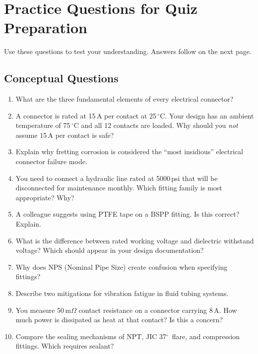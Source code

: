 \documentclass[11pt,letterpaper,twoside,openany]{book}
\newcommand{\degC}{\ensuremath{{}^{\circ}\text{C}}}
\begin{document}
\section{Practice Questions for Quiz Preparation}

Use these questions to test your understanding. Answers follow on the next page.

\subsection{Conceptual Questions}

\begin{enumerate}[leftmargin=1.5em]
  \item What are the three fundamental elements of every electrical connector?

  \item A connector is rated at 15\,A per contact at 25\,\degC{}. Your design has an ambient temperature of 75\,\degC{} and all 12 contacts are loaded. Why should you \emph{not} assume 15\,A per contact is safe?

  \item Explain why fretting corrosion is considered the ``most insidious'' electrical connector failure mode.

  \item You need to connect a hydraulic line rated at 5000\,psi that will be disconnected for maintenance monthly. Which fitting family is most appropriate? Why?

  \item A colleague suggests using PTFE tape on a BSPP fitting. Is this correct? Explain.

  \item What is the difference between rated working voltage and dielectric withstand voltage? Which should appear in your design documentation?

  \item Why does NPS (Nominal Pipe Size) create confusion when specifying fittings?

  \item Describe two mitigations for vibration fatigue in fluid tubing systems.

  \item You measure 50\,m$\Omega$ contact resistance on a connector carrying 8\,A. How much power is dissipated as heat at that contact? Is this a concern?

  \item Compare the sealing mechanisms of NPT, JIC 37$^{\circ}$\ flare, and compression fittings. Which requires sealant?
\end{enumerate}
\end{document}
